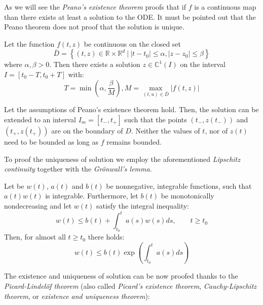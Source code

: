 As we will see the \textit{Peano's existence theorem} 
proofs that if $f$ is a continuous map than there exists 
at least a solution to the ODE.
It must be pointed out that the Peano theorem does 
not proof that the solution is unique.

\begin{theorem}
	Let the function $f(t,z)$ be continuous on the closed set
	\begin{equation}
	  \bar{D} = \left\lbrace (t,z) \in \mathbb{R} \times \mathbb{R}^d 
	  ~\big|~ |t-t_0|\leq\alpha, |z-z_0|\leq\beta \right\rbrace
	\end{equation}
	where $\alpha,\beta > 0$.
	Then there exists a solution $z \in \mathbb{C}^1(I)$ 
	on the interval $I = \left[ t_0-T, t_0+T \right]$ with:
	\begin{equation}
		T = \min \left(\alpha, \dfrac{\beta}{M} \right), M = \max_{(t,u)\in\bar{D}}|f(t,z)|
	\end{equation}
\end{theorem}

\begin{theorem}
	Let the assumptions of Peano's existence theorem hold.
	Then, the solution can be extended to an interval $I_m = [t_-, t_+]$
	such that the points $(t_-,z(t_-))$ and $(t_+, z(t_+))$
	are on the boundary of $D$. Neither the values of $t$,
	nor of $z(t)$ need to be bounded as long as $f$ remains bounded.
\end{theorem}

To proof the uniqueness of solution we employ the
aforementioned \textit{Lipschitz continuity}
together with the \textit{Gr\"onwall's lemma}.

\begin{lemma}
	Let be $w(t)$, $a(t)$ and $b(t)$ be nonnegative,
	integrable functions, such that $a(t)w(t)$ is integrable.
	Furthermore, let $b(t)$ be monotonically nondecreasing
	and let $w(t)$ satisfy the integral inequality:
	\begin{equation}
		w(t) \leq b(t) + \int_{t_0}^{t} a(s)w(s)ds, \qquad t \geq t_0
	\end{equation}
	Then, for almost all $t \geq t_0$ there holds:
	\begin{equation}
		w(t) \leq b(t)\exp\left( \int_{t_0}^{t} a(s)ds\right) 
	\end{equation}
\end{lemma}

The existence and uniqueness of solution can be now 
proofed thanks to the \textit{Picard-Lindel\"of theorem}
(also called \textit{Picard's existence theorem},
\textit{Cauchy-Lipschitz theorem}, or \textit{existence and uniqueness theorem}):

